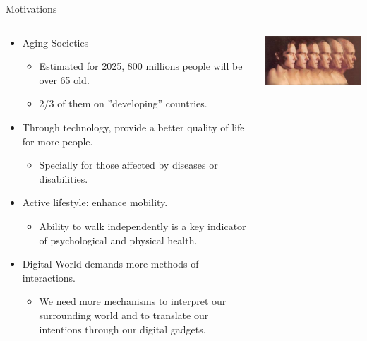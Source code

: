 \documentclass[final]{beamer}
\begin{document}
\begin{frame}
\begin{columns}
    \begin{column}{.49\textwidth}            
            \begin{block}{Motivations}
              \begin{columns}
                \begin{column}{.6\textwidth}
                  \begin{itemize}
                  \item Aging Societies
                    \begin{itemize}
		    \item Estimated for 2025, 800 millions people will be over 65 old.
                    \item 2/3 of them on ''developing'' countries.
                    \end{itemize}
                  \item Through technology, provide a better quality of life for more people.
                    \begin{itemize}
                    \item Specially for those affected by diseases or disabilities.
                    \end{itemize}
                  \item Active lifestyle: enhance mobility.
                    \begin{itemize}
                    \item Ability to walk independently is a key indicator of psychological and physical health. 
                    \end{itemize}
                  \item Digital World demands more methods of interactions.
                    \begin{itemize}
                    \item We need more mechanisms to interpret our surrounding world and to translate our intentions through our digital gadgets.
                    \end{itemize}
                  \end{itemize}
                \end{column}
                \begin{column}{.39\textwidth}
		    \centering
		    \includegraphics[width=0.95\linewidth]{images/viola/aging}

\end{column}
\end{columns}
\end{block}
\end{column}
\end{columns}
\end{frame}
\end{document}
